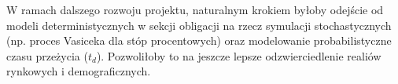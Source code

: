 \documentclass{article}
\begin{document}
W ramach dalszego rozwoju projektu, naturalnym krokiem byłoby odejście od modeli deterministycznych w sekcji obligacji na rzecz symulacji stochastycznych (np. proces Vasiceka dla stóp procentowych) oraz modelowanie probabilistyczne czasu przeżycia ($t_d$).
Pozwoliłoby to na jeszcze lepsze odzwierciedlenie realiów rynkowych i demograficznych.
\end{document}
